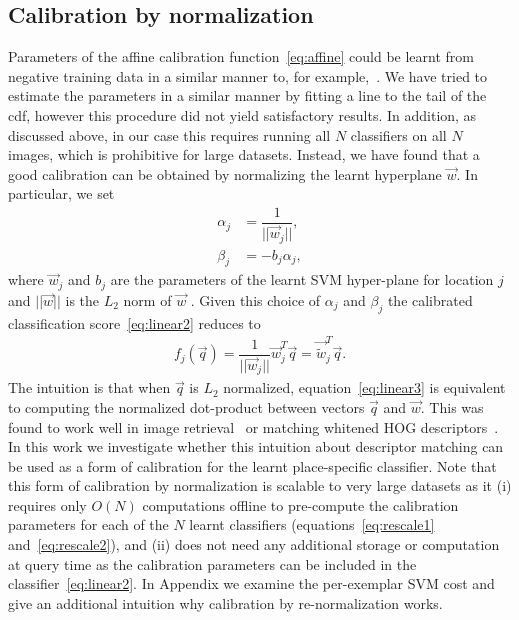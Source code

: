   \subsection{Calibration by normalization}
  \label{sec:calibration_by_renormalization}
    Parameters of the affine calibration function~\eqref{eq:affine} could be learnt from negative training data in a similar manner to, for example,~\cite{Aubry14}. 
    We have tried to estimate the parameters in a similar manner by fitting a line to the tail of the cdf, however this procedure did not yield satisfactory results.
    In addition, as discussed above, in our case this requires running all $N$ classifiers on all $N$ images, which is prohibitive for large datasets.
    Instead, we have found that a good calibration can be obtained by normalizing the learnt hyperplane $\vec{w}$. In particular, we set 
      \begin{align}
        \label{eq:rescale1}
        \alpha_j &= \dfrac{1}{||\vec{w}_j||},\\ 
        \label{eq:rescale2}
        \beta_j &=  -b_j \alpha_j, 
      \end{align}
    where $\vec{w}_j$ and $b_j$ are the parameters of the learnt SVM hyper-plane for location $j$ and $||\vec{w}||$ is the $L_2$ norm of $\vec{w}$ . Given this choice of $\alpha_j$ and $\beta_j$ the calibrated classification score~\eqref{eq:linear2} reduces to
      \begin{align}
        f_j(\vec{q}) = \dfrac{1}{||\vec{w}_j||}\vec{w}_j^T\vec{q} = \vec{\widetilde{w}}_j^T\vec{q}.
        \label{eq:linear3}
      \end{align}
    The intuition is that when $\vec{q}$ is $L_2$ normalized, equation~\eqref{eq:linear3} is equivalent to computing the normalized dot-product between vectors $\vec{q}$ and $\vec{w}$.       This was found to work well in image retrieval~\cite{Sivic03} or matching whitened HOG descriptors~\cite{Doersch13}.
    In this work we investigate whether this intuition about descriptor matching can be used as a form of calibration for the learnt place-specific classifier.  
    Note  that this form of calibration by normalization is scalable to very large datasets as it (i) requires only $O(N)$ computations offline to pre-compute the calibration parameters for each of the $N$ learnt classifiers (equations~\eqref{eq:rescale1} and~\eqref{eq:rescale2}), and (ii) does not need any additional storage or computation at query time as the calibration parameters can be included in the classifier~\eqref{eq:linear2}. In Appendix we examine the per-exemplar SVM cost and give an additional intuition why calibration by re-normalization works.




